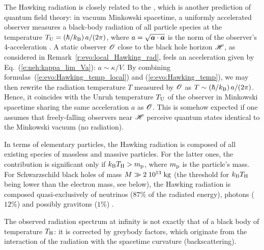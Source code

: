 \begin{remark} \label{r:evo:Unruh_effect}
The Hawking radiation is closely related to the
, which is another prediction of quantum field theory:
in vacuum Minkowski spacetime, a uniformly accelerated observer measures a black-body radiation
of all particle species at the temperature $T_{\rm U} = (\hbar/k_{\rm B}) \, a / (2\pi)$, where
$a = \sqrt{\bm{a}\cdot\bm{a}}$ is the norm of the observer's 4-acceleration \cite{Unruh76,Wald94,Carro04}.
A static observer $\mathscr{O}$ close to the black hole horizon $\mathscr{H}$, as considered in Remark~\ref{r:evo:local_Hawking_rad},
feels an acceleration given by Eq.~(\ref{e:neh:kappa_lim_Va}): $a \sim \kappa / V$.
By combining formulas~(\ref{e:evo:Hawking_temp_local}) and (\ref{e:evo:Hawking_temp}),
we may then rewrite the radiation temperature $T$ measured by $\mathscr{O}$ as
$T \sim (\hbar/k_{\rm B}) \, a / (2\pi)$. Hence, it coincides with the Unruh temperature $T_{\rm U}$ of
the observer in Minkowski spacetime sharing the same acceleration $a$ as $\mathscr{O}$.
This is somehow expected
if one assumes that freely-falling observers near $\mathscr{H}$ perceive quantum states identical to
the Minkowski vacuum (no radiation).
\end{remark}

\begin{remark} \label{r:evo:comp_Hawking_rad}
In terms of elementary particles, the Hawking radiation is composed of
all existing species of massless and massive particles. For the latter ones,
the contribution is significant only if
$k_{\rm B} T_{\rm H} > m_{\rm p}$, where $m_{\rm p}$ is the particle's mass.
For Schwarzschild black holes of mass $M \gg 2\; 10^{13} {\rm\; kg}$ (the threshold
for $k_{\rm B} T_{\rm H}$ being lower than the electron mass, see below), the Hawking radiation
is composed quasi-exclusively of neutrinos ($87\%$ of the radiated energy),
photons ($12\%$) and possibly gravitons ($1\%$) \cite{Page76,ThornZP86}.
\end{remark}

\begin{remark}
The observed radiation spectrum at infinity is not exactly that
of a black body of temperature $T_{\rm H}$: it is corrected
by greybody factors, which originate from the interaction of the radiation
with the spacetime curvature (backscattering).
\end{remark}

